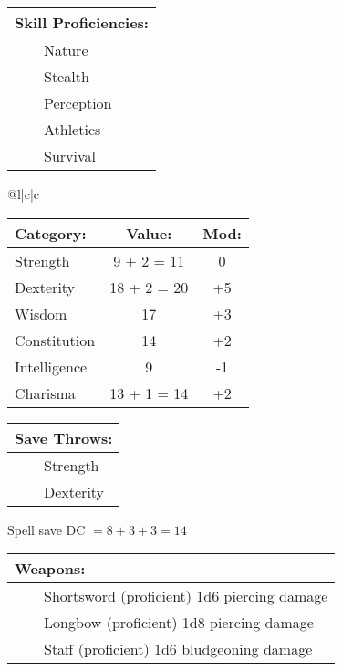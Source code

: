 \documentclass[11pt]{article}
\newcommand{\tabitem}{~~\llap{--}~~}
\begin{document}
\begin{multicols}{2}
\vspace{2mm}

\noindent \begin{tabularx}{\linewidth}{@{}l}
{\Large \textbf{Skill Proficiencies:}} \\
\hline
\tabitem Nature \\
\tabitem Stealth \\
\tabitem Perception \\
\tabitem Athletics \\
\tabitem Survival
		\end{tabularx}

\vspace{4mm}

\noindent \begin{tabularx}{\linewidth}{@{}l|c|c}
 \\
\hline
		\end{tabularx}
\noindent \begin{tabular}{@{}l|c|c}
\textbf{Category:} 			& \textbf{Value:} 	& \textbf{Mod:} \\
\hline
Strength 					& 9 + 2 = 11		& 0			\\
Dexterity 					& 18 + 2 = 20		& +5		\\
Wisdom 						& 17				& +3		\\
Constitution 				& 14 				& +2		\\
Intelligence 				& 9 				& -1		\\
Charisma 					& 13 + 1 = 14		& +2
		\end{tabular}

\vspace{4mm}

\noindent \begin{tabularx}{\linewidth}{@{}l}
{\Large \textbf{Save Throws:}} \\
\hline
\tabitem Strength \\
\tabitem Dexterity \\
		\end{tabularx}
\noindent Spell save DC $= 8 + 3 + 3 = 14$

\vspace{4mm}

\noindent \begin{tabularx}{\linewidth}{@{}l}
{\Large \textbf{Weapons:}} \\
\hline
\tabitem Shortsword (proficient) 1d6 piercing damage \\
\tabitem Longbow (proficient) 1d8 piercing damage \\
\tabitem Staff (proficient) 1d6 bludgeoning damage
		\end{tabularx}


\end{multicols}
\end{document}
